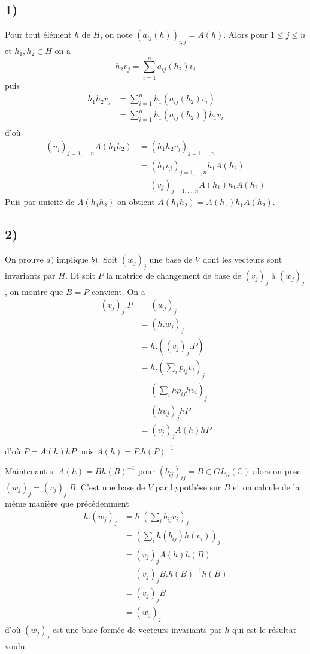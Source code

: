 \documentclass[a4paper,12pt]{article}
\newcommand{\C}{\mathbb{C}}
\theoremstyle{plain}
\theoremstyle{definition}
\theoremstyle{remark}
\begin{document}
\subsection*{1)}
Pour tout élément $h$ de $H$, on note $(a_{ij}(h))_{i,j}=A(h)$.
Alors pour $1\leq j\leq n$ et $h_1,h_2\in H$ on a 
\[h_2v_j=\sum_{i=1}^na_{ij}(h_2)v_i\]
puis 
\begin{align*}
  h_1h_2v_j&=\sum_{i=1}^nh_1(a_{ij}(h_2)v_i)\\
	   &=\sum_{i=1}^nh_1(a_{ij}(h_2))h_1v_i\\
\end{align*}
d'où
\begin{align*}
  (v_j)_{j=1,\ldots,n}A(h_1h_2)&=(h_1h_2v_j)_{j=1,\ldots,n}\\
			       &=(h_1v_j)_{j=1,\ldots,n}h_1A(h_2)\\
			       &=(v_j)_{j=1,\ldots,n}A(h_1)h_1A(h_2)
\end{align*}
Puis par unicité de $A(h_1h_2)$ on obtient 
$A(h_1h_2)=A(h_1)h_1A(h_2)$.

\subsection*{2)}
On prouve $a)$ implique $b)$. Soit $(w_j)_j$ une base de $V$
dont les vecteurs sont invariants par $H$. Et soit $P$ la matrice
de changement de base de $(v_j)_j$ à $(w_j)_j$, on montre que $B=P$
convient. On a 
\begin{align*}
  (v_j)_j.P&=(w_j)_j\\
	   &=(h.w_j)_j\\
           &=h.((v_j)_j.P)\\
	   &=h.(\sum_ip_{ij}v_i)_j\\
	   &=(\sum_ihp_{ij}hv_i)_j\\
	   &=(hv_j)_jhP\\
	   &=(v_j)_jA(h)hP\\
\end{align*}
d'où $P=A(h)hP$ puis $A(h)=P.h(P)^{-1}$.

Maintenant si $A(h)=Bh(B)^{-1}$ pour $(b_{ij})_{ij}=B\in GL_n(\C)$
alors 
on pose $(w_j)_j=(v_j)_j.B$. C'est une base de $V$ par hypothèse
sur $B$ et on calcule de la même manière que précédemment
\begin{align*}
  h.(w_j)_j&=h.(\sum_i b_{ij}v_i)_j\\
	   &=(\sum_i h(b_{ij})h(v_i))_j\\
	   &=(v_j)_jA(h)h(B)\\
	   &=(v_j)_jB.h(B)^{-1}h(B)\\
	   &=(v_j)_jB\\
	   &=(w_j)_j
\end{align*}
d'où $(w_j)_j$ est une base formée de vecteurs invariants par
$h$ qui est le résultat voulu.
\end{document}
